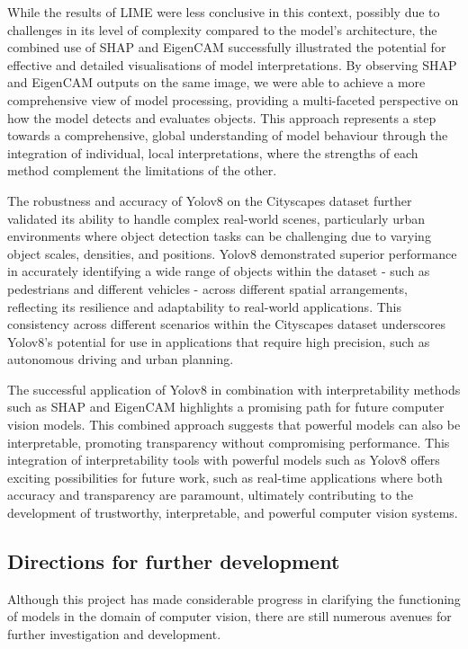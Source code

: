 While the results of LIME  were less conclusive in this context, possibly due to challenges in its level of complexity compared to the model's architecture, the combined use of SHAP and EigenCAM successfully illustrated the potential for effective and detailed visualisations of model interpretations.
By observing SHAP and EigenCAM outputs on the same image, we were able to achieve a more comprehensive view of model processing, providing a multi-faceted perspective on how the model detects and evaluates objects.
This approach represents a step towards a comprehensive, global understanding of model behaviour through the integration of individual, local interpretations, where the strengths of each method complement the limitations of the other.

The robustness and accuracy of Yolov8 on the Cityscapes dataset further validated its ability to handle complex real-world scenes, particularly urban environments where object detection tasks can be challenging due to varying object scales, densities, and positions. Yolov8 demonstrated superior performance in accurately identifying a wide range of objects within the dataset - such as pedestrians and different vehicles - across different spatial arrangements, reflecting its resilience and adaptability to real-world applications.
This consistency across different scenarios within the Cityscapes dataset underscores Yolov8's potential for use in applications that require high precision, such as autonomous driving and urban planning.

The successful application of Yolov8 in combination with interpretability methods such as SHAP and EigenCAM highlights a promising path for future computer vision models.
This combined approach suggests that powerful models can also be interpretable, promoting transparency without compromising performance.
This integration of interpretability tools with powerful models such as Yolov8 offers exciting possibilities for future work, such as real-time applications where both accuracy and transparency are paramount, ultimately contributing to the development of trustworthy, interpretable, and powerful computer vision systems.
\newpage
\subsection{Directions for further development}\label{subsec:dircetions-for-further-development}

Although this project has made considerable progress in clarifying the functioning of models in the domain of computer vision, there are still numerous avenues for further investigation and development.


